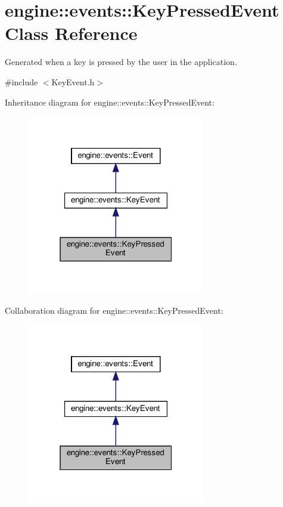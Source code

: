 \hypertarget{classengine_1_1events_1_1KeyPressedEvent}{}\section{engine\+:\+:events\+:\+:Key\+Pressed\+Event Class Reference}
\label{classengine_1_1events_1_1KeyPressedEvent}


Generated when a key is pressed by the user in the application.  




{\ttfamily \#include $<$Key\+Event.\+h$>$}



Inheritance diagram for engine\+:\+:events\+:\+:Key\+Pressed\+Event\+:\nopagebreak
\begin{figure}[H]
\begin{center}
\leavevmode
\includegraphics[width=220pt]{classengine_1_1events_1_1KeyPressedEvent__inherit__graph}
\end{center}
\end{figure}


Collaboration diagram for engine\+:\+:events\+:\+:Key\+Pressed\+Event\+:\nopagebreak
\begin{figure}[H]
\begin{center}
\leavevmode
\includegraphics[width=220pt]{classengine_1_1events_1_1KeyPressedEvent__coll__graph}
\end{center}
\end{figure}
